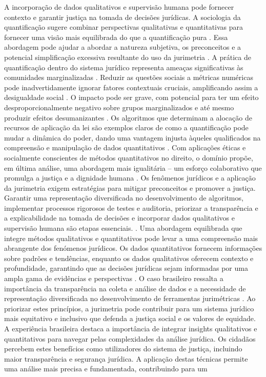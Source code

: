\begin{agradecimentos}
    A incorporação de dados qualitativos e supervisão humana pode fornecer contexto e garantir justiça na tomada de decisões jurídicas. A sociologia da quantificação sugere combinar perspectivas qualitativas e quantitativas para fornecer uma visão mais equilibrada do que a quantificação pura \cite{10.1057/s41599-020-00557-0,10.5040/9781350220645}. Essa abordagem pode ajudar a abordar a natureza subjetiva, os preconceitos e a potencial simplificação excessiva resultante do uso da jurimetria \cite{10.1057/s41599-020-00557-0,10.5040/9781350220645}. A prática de quantificação dentro do sistema jurídico representa ameaças significativas às comunidades marginalizadas \cite{10.1057/s41599-020-00557-0,10.1057/s41599-020-0396-5}. Reduzir as questões sociais a métricas numéricas pode inadvertidamente ignorar fatores contextuais cruciais, amplificando assim a desigualdade social \cite{10.1057/s41599-020-00557-0,10.1057/s41599-020-0396-5}. O impacto pode ser grave, com potencial para ter um efeito desproporcionalmente negativo sobre grupos marginalizados e até mesmo produzir efeitos desumanizantes \cite{10.1057/s41599-020-0396-5,10.1057/s41599-020-00557-0}. Os algoritmos que determinam a alocação de recursos de aplicação da lei são exemplos claros de como a quantificação pode mudar a dinâmica do poder, dando uma vantagem injusta àqueles qualificados na compreensão e manipulação de dados quantitativos \cite{10.1590/dados.2022.65.3.267,1023071190721}. Com aplicações éticas e socialmente conscientes de métodos quantitativos no direito, o domínio propõe, em última análise, uma abordagem mais igualitária – um esforço colaborativo que promulga a justiça e a dignidade humana \cite{10.1007/s11186-021}. Os fenômenos jurídicos e a aplicação da jurimetria exigem estratégias para mitigar preconceitos e promover a justiça. Garantir uma representação diversificada no desenvolvimento de algoritmos, implementar processos rigorosos de testes e auditoria, priorizar a transparência e a explicabilidade na tomada de decisões e incorporar dados qualitativos e supervisão humana são etapas essenciais. . Uma abordagem equilibrada que integre métodos qualitativos e quantitativos pode levar a uma compreensão mais abrangente dos fenómenos jurídicos. Os dados quantitativos fornecem informações sobre padrões e tendências, enquanto os dados qualitativos oferecem contexto e profundidade, garantindo que as decisões jurídicas sejam informadas por uma ampla gama de evidências e perspectivas \cite{unger2021process}. O caso brasileiro ressalta a importância da transparência na coleta e análise de dados e a necessidade de representação diversificada no desenvolvimento de ferramentas jurimétricas \cite{10.1590/dados.2022.65.3.267,10.1007/978-3-319-44000-215}. Ao priorizar estes princípios, a jurimetria pode contribuir para um sistema jurídico mais equitativo e inclusivo que defenda a justiça social e os valores de equidade. A experiência brasileira destaca a importância de integrar insights qualitativos e quantitativos para navegar pelas complexidades da análise jurídica. Os cidadãos percebem estes benefícios como utilizadores do sistema de justiça, incluindo maior transparência e segurança jurídica. A aplicação destas técnicas permite uma análise mais precisa e fundamentada, contribuindo para um 
\end{agradecimentos}
